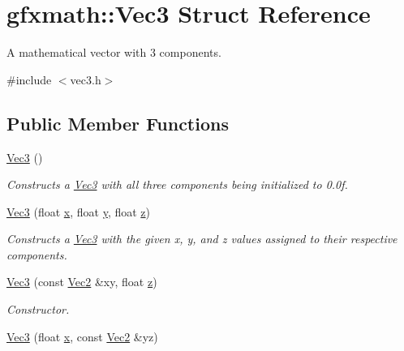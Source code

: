 \hypertarget{structgfxmath_1_1_vec3}{}\section{gfxmath\+:\+:Vec3 Struct Reference}
\label{structgfxmath_1_1_vec3}


A mathematical vector with 3 components.  




{\ttfamily \#include $<$vec3.\+h$>$}

\subsection*{Public Member Functions}
\begin{DoxyCompactItemize}
\item 
\hyperlink{structgfxmath_1_1_vec3_a7ef06d33252e5c50c249d06eb1363700}{Vec3} ()
\begin{DoxyCompactList}\small\item\em Constructs a \hyperlink{structgfxmath_1_1_vec3}{Vec3} with all three components being initialized to 0.\+0f. \end{DoxyCompactList}\item 
\hyperlink{structgfxmath_1_1_vec3_a9eed21b7873f58760d6a8751e9972617}{Vec3} (float \hyperlink{structgfxmath_1_1_vec3_adb7cecf3b6d25eecf3924583f41d8c3a}{x}, float \hyperlink{structgfxmath_1_1_vec3_a398bee406395fdc1ad381f5b70d7fd99}{y}, float \hyperlink{structgfxmath_1_1_vec3_a93c1920712889d4f10520c7dc76a79c7}{z})
\begin{DoxyCompactList}\small\item\em Constructs a \hyperlink{structgfxmath_1_1_vec3}{Vec3} with the given x, y, and z values assigned to their respective components. \end{DoxyCompactList}\item 
\hyperlink{structgfxmath_1_1_vec3_a5e51e927f3867e99d09ba451a51c0435}{Vec3} (const \hyperlink{structgfxmath_1_1_vec2}{Vec2} \&xy, float \hyperlink{structgfxmath_1_1_vec3_a93c1920712889d4f10520c7dc76a79c7}{z})
\begin{DoxyCompactList}\small\item\em Constructor. \end{DoxyCompactList}\item 
\hyperlink{structgfxmath_1_1_vec3_abed154f883720d6cb93efa9f111f93b6}{Vec3} (float \hyperlink{structgfxmath_1_1_vec3_adb7cecf3b6d25eecf3924583f41d8c3a}{x}, const \hyperlink{structgfxmath_1_1_vec2}{Vec2} \&yz)

\end{DoxyCompactItemize}
